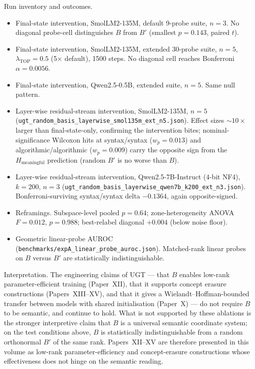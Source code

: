 \documentclass[11pt]{article}
\begin{document}
Run inventory and outcomes.
\begin{itemize}
\item Final-state intervention, SmolLM2-135M, default 9-probe
  suite, $n{=}3$. No diagonal probe-cell distinguishes $B$ from $B'$
  (smallest $p{=}0.143$, paired $t$).
\item Final-state intervention, SmolLM2-135M, extended 30-probe
  suite, $n{=}5$, $\lambda_\text{TOP}{=}0.5$ (5$\times$ default), 1500
  steps. No diagonal cell reaches Bonferroni $\alpha{=}0.0056$.
\item Final-state intervention, Qwen2.5-0.5B, extended suite,
  $n{=}5$. Same null pattern.
\item Layer-wise residual-stream intervention, SmolLM2-135M,
  $n{=}5$ (\texttt{ugt\_random\_basis\_layerwise\_smol135m\_ext\_n5.json}).
  Effect sizes $\sim 10\times$ larger than final-state-only,
  confirming the intervention bites; nominal-significance Wilcoxon
  hits at syntax/syntax ($w_p{=}0.013$) and algorithmic/algorithmic
  ($w_p{=}0.009$) carry the opposite sign from the
  $H_\text{meaningful}$ prediction (random $B'$ is no worse than $B$).
\item Layer-wise residual-stream intervention, Qwen2.5-7B-Instruct
  (4-bit NF4), $k{=}200$, $n{=}3$
  (\texttt{ugt\_random\_basis\_layerwise\_qwen7b\_k200\_ext\_n3.json}).
  Bonferroni-surviving syntax/syntax delta $-0.1364$, again
  opposite-signed.
\item Reframings. Subspace-level pooled $p{=}0.64$;
  zone-heterogeneity ANOVA $F{=}0.012$, $p{=}0.988$; best-relabel
  diagonal $+0.004$ (below noise floor).
\item Geometric linear-probe AUROC
  (\texttt{benchmarks/expA\_linear\_probe\_auroc.json}).
  Matched-rank linear probes on $B$ versus $B'$ are statistically
  indistinguishable.
\end{itemize}

Interpretation. The engineering claims of UGT --- that
$B$ enables low-rank parameter-efficient training (Paper~XII), that
it supports concept erasure constructions (Papers~XIII--XV), and that
it gives a Wielandt--Hoffman-bounded transfer between models with
shared initialisation (Paper~X) --- do not require $B$ to be
semantic, and continue to hold. What is not supported by these
ablations is the stronger interpretive claim that $B$ is a
universal semantic coordinate system; on the test conditions
above, $B$ is statistically indistinguishable from a random
orthonormal $B'$ of the same rank. Papers~XII--XV are therefore
presented in this volume as low-rank parameter-efficiency and
concept-erasure constructions whose effectiveness does not hinge on
the semantic reading.
\end{document}
